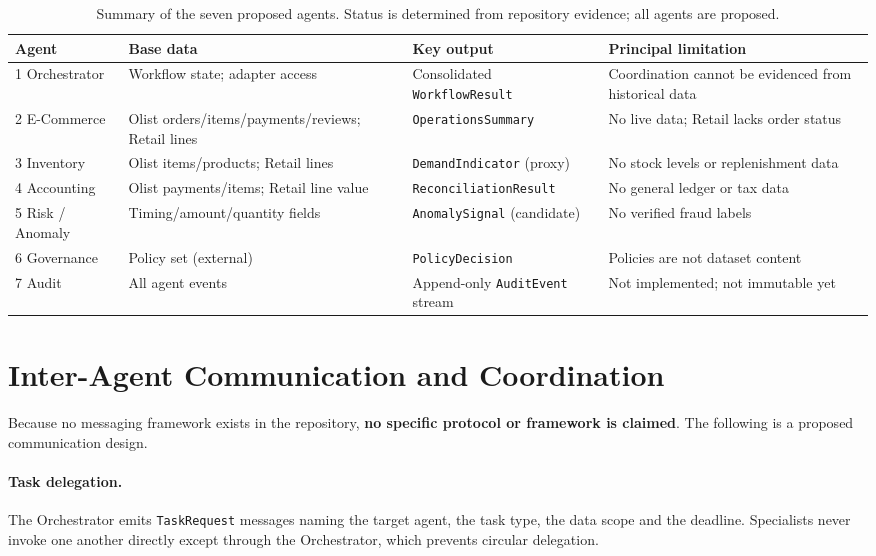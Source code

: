 \documentclass[11pt,a4paper]{article}
\newcommand{\code}[1]{\texttt{#1}}
\begin{document}
\begin{table}[H]
\centering
\small
\caption{Summary of the seven proposed agents. Status is determined from repository evidence; all agents are proposed.}
\label{tab:agentsum}
\begin{tabular}{L{2.4cm}L{3.4cm}L{4.2cm}L{4.5cm}}
\toprule
\textbf{Agent} & \textbf{Base data} & \textbf{Key output} & \textbf{Principal limitation} \\
 Orchestrator & Workflow state; adapter access & Consolidated \code{WorkflowResult} & Coordination cannot be evidenced from historical data \\
2 E-Commerce & Olist orders/\allowbreak items/\allowbreak payments/\allowbreak reviews; Retail lines & \code{OperationsSummary} & No live data; Retail lacks order status \\
3 Inventory & Olist items/products; Retail lines & \code{DemandIndicator} (proxy) & No stock levels or replenishment data \\
4 Accounting & Olist payments/items; Retail line value & \code{ReconciliationResult} & No general ledger or tax data \\
5 Risk / Anomaly & Timing/\allowbreak amount/\allowbreak quantity fields & \code{AnomalySignal} (candidate) & No verified fraud labels \\
6 Governance & Policy set (external) & \code{PolicyDecision} & Policies are not dataset content \\
7 Audit & All agent events & Append-only \code{AuditEvent} stream & Not implemented; not immutable yet \\
\bottomrule
\end{tabular}
\end{table}

\section{Inter-Agent Communication and Coordination}
\label{sec:comms}
Because no messaging framework exists in the repository, \textbf{no specific protocol or framework is claimed}. The following is a proposed communication design.
\paragraph{Task delegation.} The Orchestrator emits \code{TaskRequest} messages naming the target agent, the task type, the data scope and the deadline. Specialists never invoke one another directly except through the Orchestrator, which prevents circular delegation.
\end{document}
